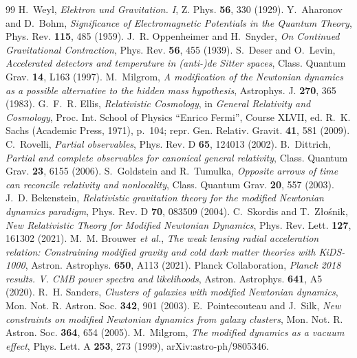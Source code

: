 \documentclass[11pt]{article}
\begin{document}
\begin{thebibliography}{99}
 H.~Weyl, \emph{Elektron und Gravitation. I}, Z. Phys. \textbf{56}, 330 (1929).
 Y.~Aharonov and D.~Bohm, \emph{Significance of Electromagnetic Potentials in the Quantum Theory}, Phys. Rev. \textbf{115}, 485 (1959).
 J.~R. Oppenheimer and H.~Snyder, \emph{On Continued Gravitational Contraction}, Phys. Rev. \textbf{56}, 455 (1939).
 S.~Deser and O.~Levin, \emph{Accelerated detectors and temperature in (anti-)de Sitter spaces}, Class. Quantum Grav. \textbf{14}, L163 (1997).
 M.~Milgrom, \emph{A modification of the Newtonian dynamics as a possible alternative to the hidden mass hypothesis}, Astrophys. J. \textbf{270}, 365 (1983).
 G.~F.~R. Ellis, \emph{Relativistic Cosmology}, in \emph{General Relativity and Cosmology}, Proc. Int. School of Physics ``Enrico Fermi'', Course XLVII, ed. R.~K. Sachs (Academic Press, 1971), p.~104; repr. Gen. Relativ. Gravit. \textbf{41}, 581 (2009).
 C.~Rovelli, \emph{Partial observables}, Phys. Rev. D \textbf{65}, 124013 (2002).
 B.~Dittrich, \emph{Partial and complete observables for canonical general relativity}, Class. Quantum Grav. \textbf{23}, 6155 (2006).
 S.~Goldstein and R.~Tumulka, \emph{Opposite arrows of time can reconcile relativity and nonlocality}, Class. Quantum Grav. \textbf{20}, 557 (2003).
 J.~D. Bekenstein, \emph{Relativistic gravitation theory for the modified Newtonian dynamics paradigm}, Phys. Rev. D \textbf{70}, 083509 (2004).
 C.~Skordis and T.~Z{\l}o\'snik, \emph{New Relativistic Theory for Modified Newtonian Dynamics}, Phys. Rev. Lett. \textbf{127}, 161302 (2021).
 M.~M. Brouwer \emph{et al.}, \emph{The weak lensing radial acceleration relation: Constraining modified gravity and cold dark matter theories with KiDS-1000}, Astron. Astrophys. \textbf{650}, A113 (2021).
 Planck Collaboration, \emph{Planck 2018 results. V. CMB power spectra and likelihoods}, Astron. Astrophys. \textbf{641}, A5 (2020).
 R.~H. Sanders, \emph{Clusters of galaxies with modified Newtonian dynamics}, Mon. Not. R. Astron. Soc. \textbf{342}, 901 (2003).
 E.~Pointecouteau and J.~Silk, \emph{New constraints on modified Newtonian dynamics from galaxy clusters}, Mon. Not. R. Astron. Soc. \textbf{364}, 654 (2005).
 M.~Milgrom, \emph{The modified dynamics as a vacuum effect}, Phys. Lett. A \textbf{253}, 273 (1999), arXiv:astro-ph/9805346.

\end{thebibliography}
\end{document}
